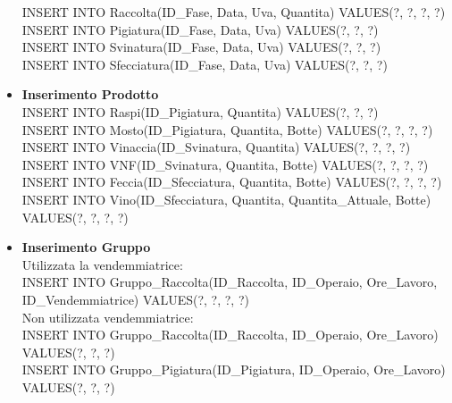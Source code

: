 \documentclass{article}
\begin{document}
\begin{itemize}
INSERT INTO Raccolta(ID\_Fase, Data, Uva, Quantita) VALUES(?, ?, ?, ?)\\\newline
INSERT INTO Pigiatura(ID\_Fase, Data, Uva) VALUES(?, ?, ?)\\\newline
INSERT INTO Svinatura(ID\_Fase, Data, Uva) VALUES(?, ?, ?)\\\newline
INSERT INTO Sfecciatura(ID\_Fase, Data, Uva) VALUES(?, ?, ?)\\\newline
\newpage
\item \textbf{Inserimento Prodotto}\\\newline
INSERT INTO Raspi(ID\_Pigiatura, Quantita) VALUES(?, ?, ?)\\\newline
INSERT INTO Mosto(ID\_Pigiatura, Quantita, Botte) VALUES(?, ?, ?, ?)\\\newline
INSERT INTO Vinaccia(ID\_Svinatura, Quantita) VALUES(?, ?, ?, ?)\\\newline
INSERT INTO VNF(ID\_Svinatura, Quantita, Botte) VALUES(?, ?, ?, ?)\\\newline
INSERT INTO Feccia(ID\_Sfecciatura, Quantita, Botte) VALUES(?, ?, ?, ?)\\\newline
INSERT INTO Vino(ID\_Sfecciatura, Quantita, Quantita\_Attuale, Botte) VALUES(?, ?, ?, ?)\\\newline
\item \textbf{Inserimento Gruppo}\\\newline
Utilizzata la vendemmiatrice:\\
INSERT INTO Gruppo\_Raccolta(ID\_Raccolta, ID\_Operaio, Ore\_Lavoro, ID\_Vendemmiatrice) VALUES(?, ?, ?, ?)\\\newline
Non utilizzata vendemmiatrice:\\
INSERT INTO Gruppo\_Raccolta(ID\_Raccolta, ID\_Operaio, Ore\_Lavoro) VALUES(?, ?, ?)\\\newline
\newline
INSERT INTO Gruppo\_Pigiatura(ID\_Pigiatura, ID\_Operaio, Ore\_Lavoro) VALUES(?, ?, ?)\\\newline

\end{itemize}
\end{document}
